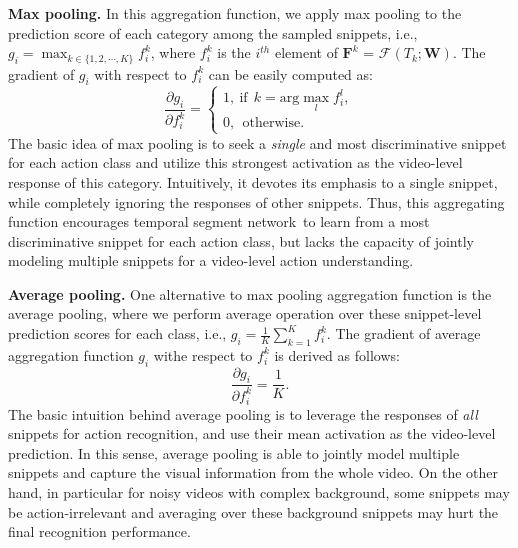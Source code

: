 \documentclass[10pt,journal,compsoc]{IEEEtran}
\newcommand{\SEGNET}{temporal segment network}
\begin{document}
{\bf Max pooling.} In this aggregation function, we apply max pooling to the prediction score of each category among the sampled snippets, i.e., $g_i = \max_{k \in \{1,2,\cdots, K\}} f_i^k$, where $f_i^k$ is the $i^{th}$ element of $\mathbf{F}^k$ = $\mathcal{F}(T_k; \mathbf{W})$. The gradient of $g_i$ with respect to $f_i^k$ can be easily computed as:
\begin{equation}
\frac{\partial g_i}{\partial f_i^k} =  \left \{ 
 \begin{array}{l}
 1, \ \textrm{if} \ \ k=\textrm{arg}\max_{l} f_i^l, \\
 0,\ \ \textrm{otherwise.}
 \end{array} 
 \right.
\end{equation}
The basic idea of max pooling is to seek a {\em single} and most discriminative snippet for each action class and utilize this strongest activation as the video-level response of this category. Intuitively, it devotes its emphasis to a single snippet, while completely ignoring the responses of other snippets. Thus, this aggregating function encourages \SEGNET~to learn from a most discriminative snippet for each action class, but lacks the capacity of jointly modeling multiple snippets for a video-level action understanding.

{\bf Average pooling.} One alternative to max pooling aggregation function is the average pooling, where we perform average operation over these snippet-level prediction scores for each class, i.e., $g_i = \frac{1}{K} \sum_{k=1}^K f_i^k$. The gradient of average aggregation function $g_i$ withe respect to $f_i^k$ is derived as follows:
\begin{equation}
\frac{\partial g_i}{\partial f_i^k} = \frac{1}{K}.
\end{equation}
The basic intuition behind average pooling is to leverage the responses of {\em all} snippets for action recognition, and use their mean activation as the video-level prediction. In this sense, average pooling is able to jointly model multiple snippets and capture the visual information from the whole video. On the other hand, in particular for noisy videos with complex background, some snippets may be action-irrelevant and averaging over these background snippets may hurt the final recognition performance.
\end{document}
